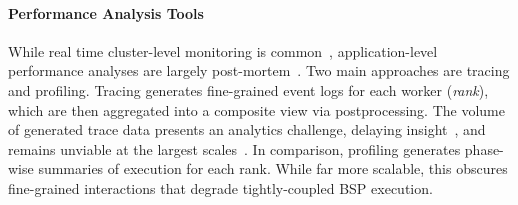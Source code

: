 \paragraph{Performance Analysis Tools}
While real time cluster-level monitoring is common~\cite{Schwa2021:LDMS}, application-level
performance analyses are largely
post-mortem~\cite{Wylie2025:15Years,Shend2006:TAU,2025:kineto,:HolisticTraceAnalysis}.
Two main approaches are tracing and profiling.
Tracing generates fine-grained event logs for each worker (\emph{rank}), which are then aggregated
into a composite view via postprocessing.
The volume of generated trace data presents an analytics challenge, delaying
insight~\cite{Devar2024:DFTracer}, and remains unviable at the largest
scales~\cite{Cui2025:XPUTimer}.
In comparison, profiling generates phase-wise summaries of execution for each rank.
While far more scalable, this obscures fine-grained interactions that degrade tightly-coupled BSP
execution.

